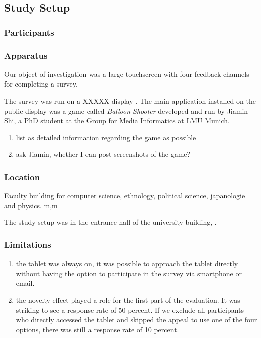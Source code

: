 \subsection{Study Setup}

	\subsubsection{Participants}

	\subsubsection{Apparatus}

		Our object of investigation was a large touchscreen with four feedback channels for completing a survey.

		The survey was run on a XXXXX display . The main application installed on the public display was a game called \textit{Balloon Shooter} developed and run by Jiamin Shi, a PhD student at the Group for Media Informatics at LMU Munich.

		\begin{enumerate}
		\item list as detailed information regarding the game as possible
		\item ask Jiamin, whether I can post screenshots of the game?
		\end{enumerate}

	\subsubsection{Location}

	Faculty building for computer science, ethnology, political science, japanologie and physics. m,m

	The study setup was in the entrance hall of the university building, .



	\subsubsection{Limitations}

	\begin{enumerate}
	\item the tablet was always on, it was possible to approach the tablet directly without having the option to participate in the survey via smartphone or email. 
	\item the novelty effect played a role for the first part of the evaluation. It was striking to see a response rate of 50 percent. If we exclude all participants who directly accessed the tablet and skipped the appeal to use one of the four options, there was still a response rate of 10 percent.
	\end{enumerate}



